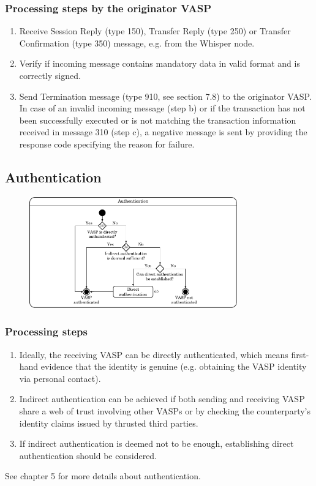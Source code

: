 \documentclass{article}
\begin{document}
\subsubsection{Processing steps by the originator VASP}
\begin{enumerate}
    \item Receive Session Reply (type 150),  Transfer Reply (type 250) or Transfer Confirmation (type 350) message, e.g. from the Whisper node.
    \item Verify if incoming message contains mandatory data in valid format and is correctly signed.
    \item Send Termination message (type 910, see section 7.8) to the originator VASP. In case of an invalid incoming message (step b) or if the transaction has not been successfully executed or is not matching the transaction information received in message 310 (step c), a negative message is sent by providing the response code specifying the reason for failure.
\end{enumerate}

\subsection{Authentication}
\begin{figure}[h]
    \centering
    \includegraphics[width=0.8\textwidth]{g16.pdf}
\end{figure}
\subsubsection{Processing steps}
\begin{enumerate}
    \item Ideally, the receiving VASP can be directly authenticated, which means first-hand evidence that the identity is genuine (e.g. obtaining the VASP identity via personal contact).
    \item Indirect authentication can be achieved if both sending and receiving VASP share a web of trust involving other VASPs or by checking the counterparty’s identity claims issued by thrusted third parties.
    \item If indirect authentication is deemed not to be enough, establishing direct authentication should be considered.
\end{enumerate}
See chapter 5 for more details about authentication.
\end{document}
